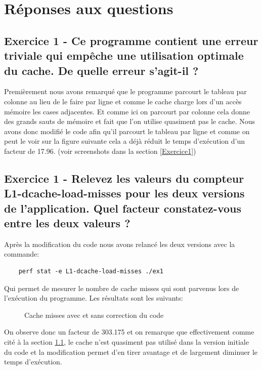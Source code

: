\documentclass{ReportTemplate}
\begin{document}
\section{Réponses aux questions}
\subsection{Exercice 1 - Ce programme contient une erreur triviale qui empêche
une utilisation optimale du cache. De quelle erreur s’agit-il ?}
\label{exo1_q1}
Premièrement nous avons remarqué que le programme parcourt le tableau par
colonne au lieu de le faire par ligne et comme le cache charge lors d'un accès
mémoire les cases adjacentes. Et comme ici on parcourt par colonne cela donne
des grands sauts de mémoire et fait que l'on utilise quasiment pas le cache.
Nous avons donc modifié le code afin qu'il parcourt le tableau par ligne et
comme on peut le voir sur la figure suivante cela a déjà réduit le temps
d'exécution d'un facteur de 17.96. (voir screenshots dans la section \ref{Exercice1})
\subsection{Exercice 1 - Relevez les valeurs du compteur L1-dcache-load-misses
pour les deux versions de l’application. Quel facteur constatez-vous entre les
deux valeurs ?}
Après la modification du code nous avons relancé les deux versions avec la
commande:
\begin{verbatim}
    perf stat -e L1-dcache-load-misses ./ex1
\end{verbatim}
Qui permet de mesurer le nombre de cache misses qui sont parvenus lors de
l'exécution du programme. Les résultats sont les suivants:
\begin{figure}[H]
    \centering
    \hfill
    \caption{Cache misses avec et sans correction du code}
    \label{fig:CacheMisses}
\end{figure}
On observe donc un facteur de 303.175 et on remarque que effectivement comme
cité à la section \ref{exo1_q1}, le cache n'est quasiment pas utilisé dans la
version initiale du code et la modification permet d'en tirer avantage et de
largement diminuer le temps d'exécution.
\end{document}
